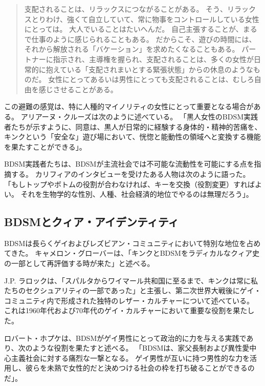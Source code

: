 \documentclass[paper=a4,book,openany]{jlreq} \usepackage{mystyle}
\begin{document}
\begin{quote}
  支配されることは、リラックスにつながることがある。
そう、リラックス{\DDASH}とりわけ、強くて自立していて、常に物事をコントロールしている女性にとっては。
大人でいることはたいへんだ。
自己主張することが、まるで仕事のように感じられることもある。
だからこそ、遊びの時間には、それから解放される「バケーション」を求めたくなることもある。
パートナーに指示され、主導権を握られ、支配されることは、多くの女性が日常的に抱えている「支配されまいとする緊張状態」からの休息のようなものだ。
女性にとって{\DDASH}あるいは男性にとっても{\DDASH}支配されることは、むしろ自由を感じさせることがある。
\citep{cicero12:_six_myths_kink_bdsm}
\end{quote}

この避難の感覚は、特に人種的マイノリティの女性にとって重要となる場合がある。
アリアーヌ・クルーズは次のように述べている。
「黒人女性のBDSM実践者たちが示すように、同意は、黒人が日常的に経験する身体的・精神的苦痛を、キンクという「安全な」遊び場において、恍惚と能動性の領域へと変換する機能を果たすことができる」\citep{wachter-grene16:_conver_arian_cruz}。

BDSM実践者たちは、BDSMが主流社会では不可能な流動性を可能にする点を指摘する。
カリフィアのインタビューを受けたある人物は次のように語った。
「もしトップやボトムの役割が合わなければ、キーを交換（役割変更）すればよい。
それを生物学的な性別、人種、社会経済的地位でやるのは無理だろう」\citep[pp. 173-174]{califia00:_public_sex}。

\subsection{BDSMとクィア・アイデンティティ}

BDSMは長らくゲイおよびレズビアン・コミュニティにおいて特別な地位を占めてきた。
キャメロン・グローバーは、「キンクとBDSMをラディカルなクィア史の一部として再評価する時が来た」と述べる\citep{glover18:_its_time_recen_kink_bdsm}。

J.P. ラロックは、「スパルタからワイマール共和国に至るまで、キンクは常に私たちのセクシュアリティの一部であった」と主張し、第二次世界大戦後にゲイ・コミュニティ内で形成された独特のレザー・カルチャーについて述べている。
これは1960年代および70年代のゲイ・カルチャーにおいて重要な役割を果たした\citep{larocque14:_brief_histor_bdsm}。

ロバート・ホプケは、BDSMがゲイ男性にとって政治的に力を与える実践であり、次のような役割を果たすと述べる。
「BDSMは、家父長制および異性愛中心主義社会に対する痛烈な一撃となる。
ゲイ男性が互いに持つ男性的な力を活用し、彼らを未熟で女性的だと決めつける社会の枠を打ち破ることができるのだ」\citep[p.71]{hopcke91:_jung_jungian_homos}。
\end{document}
